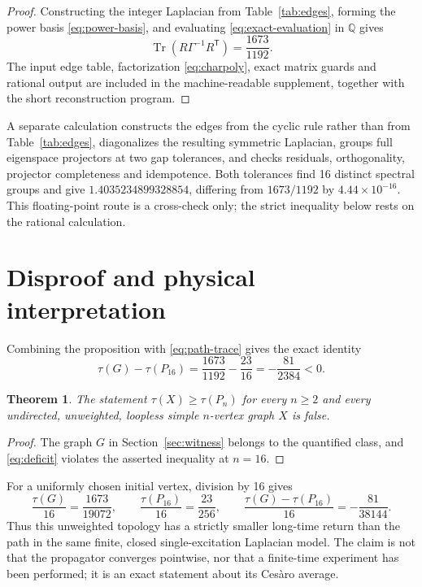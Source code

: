 \documentclass[11pt]{article}
\newtheorem{theorem}{Theorem}
\newcommand{\Tr}{\operatorname{Tr}}
\begin{document}
\begin{proof}
Constructing the integer Laplacian from Table~\ref{tab:edges}, forming the
power basis \eqref{eq:power-basis}, and evaluating
\eqref{eq:exact-evaluation} in $\mathbb Q$ gives
\[
  \Tr(R\Gamma^{-1}R^{\mathsf T})=\frac{1673}{1192}.
\]
The input edge table, factorization \eqref{eq:charpoly}, exact matrix guards
and rational output are included in the machine-readable supplement, together
with the short reconstruction program.
\end{proof}

A separate calculation constructs the edges from the cyclic rule rather than
from Table~\ref{tab:edges}, diagonalizes the resulting symmetric Laplacian,
groups full eigenspace projectors at two gap tolerances, and checks residuals,
orthogonality, projector completeness and idempotence.  Both tolerances find
16 distinct spectral groups and give
$1.4035234899328854$, differing from $1673/1192$ by
$4.44\times10^{-16}$.  This floating-point route is a cross-check only; the
strict inequality below rests on the rational calculation.

\section{Disproof and physical interpretation}

Combining the proposition with \eqref{eq:path-trace} gives the exact identity
\begin{equation}
  \tau(G)-\tau(P_{16})
  =\frac{1673}{1192}-\frac{23}{16}
  =-\frac{81}{2384}<0.
  \label{eq:deficit}
\end{equation}

\begin{theorem}
The statement $\tau(X)\ge\tau(P_n)$ for every $n\ge2$ and every undirected,
unweighted, loopless simple $n$-vertex graph $X$ is false.
\end{theorem}

\begin{proof}
The graph $G$ in Section~\ref{sec:witness} belongs to the quantified class,
and \eqref{eq:deficit} violates the asserted inequality at $n=16$.
\end{proof}

For a uniformly chosen initial vertex, division by 16 gives
\[
  \frac{\tau(G)}{16}=\frac{1673}{19072},
  \qquad
  \frac{\tau(P_{16})}{16}=\frac{23}{256},
  \qquad
  \frac{\tau(G)-\tau(P_{16})}{16}=-\frac{81}{38144}.
\]
Thus this unweighted topology has a strictly smaller long-time return than
the path in the same finite, closed single-excitation Laplacian model.  The
claim is not that the propagator converges pointwise, nor that a finite-time
experiment has been performed; it is an exact statement about its Ces\`aro
average.
\end{document}

